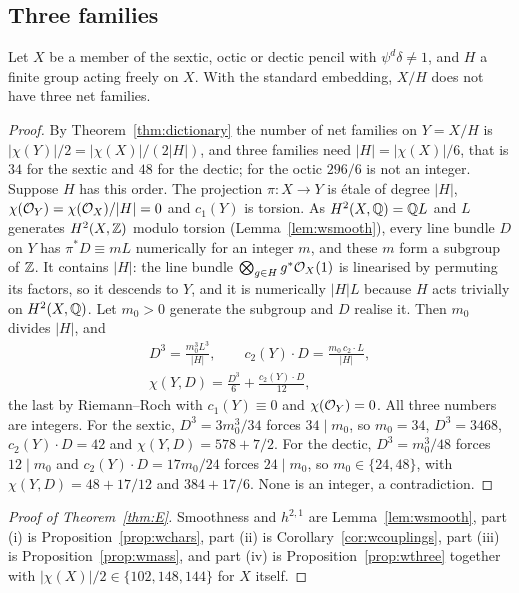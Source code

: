 \subsection{Three families}

\begin{proposition}\label{prop:wthree}
Let $X$ be a member of the sextic, octic or dectic pencil with
$\psi^d\delta\ne1$, and $H$ a finite group acting freely on $X$. With the
standard embedding, $X/H$ does not have three net families.
\end{proposition}

\begin{proof}
By Theorem~\ref{thm:dictionary} the number of net families on $Y=X/H$ is
$|\chi(Y)|/2=|\chi(X)|/(2|H|)$, and three families need
$|H|=|\chi(X)|/6$, that is $34$ for the sextic and $48$ for the dectic; for
the octic $296/6$ is not an integer. Suppose $H$ has this order. The
projection $\pi\colon X\to Y$ is \'etale of degree $|H|$, $\chi(\mathcal{O}_Y)=
\chi(\mathcal{O}_X)/|H|=0$ and $c_1(Y)$ is torsion. As $H^2(X,\mathbb{Q})=\mathbb{Q} L$ and $L$
generates $H^2(X,\mathbb{Z})$ modulo torsion (Lemma~\ref{lem:wsmooth}), every line
bundle $D$ on $Y$ has $\pi^*D\equiv mL$ numerically for an integer $m$, and
these $m$ form a subgroup of $\mathbb{Z}$. It contains $|H|$: the line bundle
$\bigotimes_{g\in H}g^*\mathcal{O}_X(1)$ is linearised by permuting its factors, so
it descends to $Y$, and it is numerically $|H|L$ because $H$ acts trivially
on $H^2(X,\mathbb{Q})$. Let $m_0>0$ generate the subgroup and $D$ realise it. Then
$m_0$ divides $|H|$, and
\[
\begin{gathered}
D^3=\frac{m_0^3L^3}{|H|},\qquad c_2(Y)\cdot D=\frac{m_0\,c_2\cdot L}{|H|},\\
\chi(Y,D)=\frac{D^3}{6}+\frac{c_2(Y)\cdot D}{12},
\end{gathered}
\]
the last by Riemann--Roch with $c_1(Y)\equiv0$ and $\chi(\mathcal{O}_Y)=0$. All
three numbers are integers. For the sextic, $D^3=3m_0^3/34$ forces
$34\mid m_0$, so $m_0=34$, $D^3=3468$, $c_2(Y)\cdot D=42$ and
$\chi(Y,D)=578+7/2$. For the dectic, $D^3=m_0^3/48$ forces $12\mid m_0$ and
$c_2(Y)\cdot D=17m_0/24$ forces $24\mid m_0$, so $m_0\in\{24,48\}$, with
$\chi(Y,D)=48+17/12$ and $384+17/6$. None is an integer, a contradiction.
\end{proof}

\begin{proof}[Proof of Theorem~\ref{thm:E}]
Smoothness and $h^{2,1}$ are Lemma~\ref{lem:wsmooth}, part (i) is
Proposition~\ref{prop:wchars}, part (ii) is
Corollary~\ref{cor:wcouplings}, part (iii) is Proposition~\ref{prop:wmass},
and part (iv) is Proposition~\ref{prop:wthree} together with
$|\chi(X)|/2\in\{102,148,144\}$ for $X$ itself.
\end{proof}

